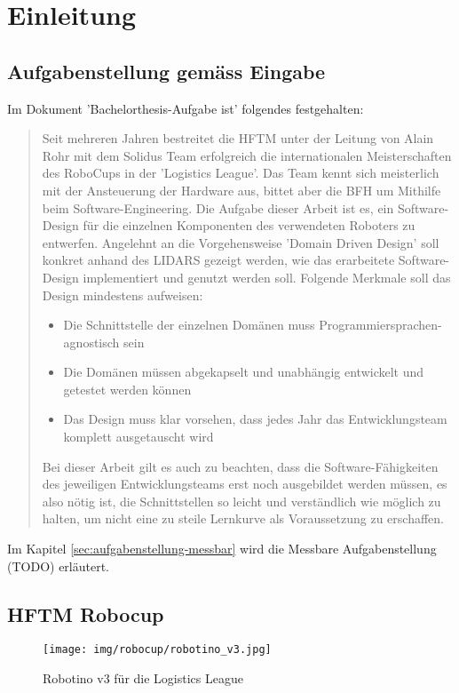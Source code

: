 \chapter{Einleitung}
\section{Aufgabenstellung gemäss Eingabe}
\label{chap:aufgabenstellung}
Im Dokument 'Bachelorthesis-Aufgabe ist' folgendes festgehalten:
\begin{quote}
Seit mehreren Jahren bestreitet die HFTM unter der Leitung von Alain Rohr mit dem Solidus Team erfolgreich die internationalen Meisterschaften des RoboCups in der 'Logistics League'.
Das Team kennt sich meisterlich mit der Ansteuerung der Hardware aus, bittet aber die BFH um Mithilfe beim Software-Engineering.
Die Aufgabe dieser Arbeit ist es, ein Software-Design für die einzelnen Komponenten des verwendeten Roboters zu entwerfen. Angelehnt an die Vorgehensweise 'Domain Driven Design' soll konkret anhand des LIDARS gezeigt werden, wie das erarbeitete Software-Design implementiert und genutzt werden soll. Folgende Merkmale soll das Design mindestens aufweisen:

\begin{itemize}
	\item Die Schnittstelle der einzelnen Domänen muss Programmiersprachen-agnostisch sein
	\item Die Domänen müssen abgekapselt und unabhängig entwickelt und getestet werden können
	\item Das Design muss klar vorsehen, dass jedes Jahr das Entwicklungsteam komplett ausgetauscht wird
\end{itemize}
Bei dieser Arbeit gilt es auch zu beachten, dass die Software-Fähigkeiten des jeweiligen Entwicklungsteams erst noch ausgebildet werden müssen, es also nötig ist, die Schnittstellen so leicht und verständlich wie möglich zu halten, um nicht eine zu steile Lernkurve als Voraussetzung zu erschaffen.
\end{quote}
Im Kapitel \ref{sec:aufgabenstellung-messbar} wird die Messbare Aufgabenstellung (TODO) erläutert.

\section{HFTM Robocup}
\begin{figure}[H]
	\centering
	\texttt{[image: img/robocup/robotino\_v3.jpg]}
	\caption{Robotino v3 für die Logistics League\cite{robotino}}
	\label{fig:robotino}
\end{figure}

